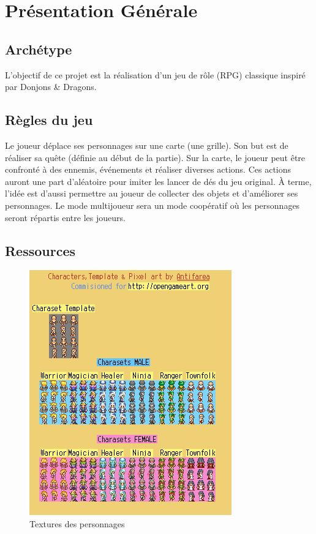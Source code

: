 \documentclass[a4paper,12pt]{article}
\begin{document}
\renewcommand{\labelitemi}{$\bullet$}

\thispagestyle{empty}



\clearpage

{\small
\tableofcontents
}



\clearpage
\section{Présentation Générale}

\subsection{Archétype}
L’objectif de ce projet est la réalisation d’un jeu de rôle (RPG) classique inspiré par Donjons \& Dragons.

\subsection{Règles du jeu}
Le joueur déplace ses personnages sur une carte (une grille). Son but est de réaliser sa quête (définie au début de la partie). Sur la carte, le joueur peut être confronté à des ennemis, événements et réaliser diverses actions. Ces actions auront une part d’aléatoire pour imiter les lancer de dés du jeu original. À terme, l’idée est d’aussi permettre au joueur de collecter des objets et d'améliorer ses personnages. Le mode multijoueur sera un mode coopératif où les personnages seront répartis entre les joueurs. 

\subsection{Ressources}

\begin{figure}[hbt!]
    \centering
    \includegraphics[scale=1, angle=0]{images/texture_persos1.png}
    \caption{Textures des personnages}
    \label{fig:textPerso}
\end{figure}
\end{document}
